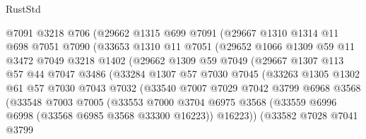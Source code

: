 \begin{lexlean}{RustStd}
\begin{coremodule}
                  @7091
                  @3218
                  @706
                  (@29662
                    @1315
                    @699
                    @7091
                    (@29667
                      @1310
                      @1314
                      @11
                      @698
                      @7051
                      @7090
                      (@33653
                        @1310
                        @11
                        @7051
                        (@29652
                          @1066
                          @1309
                          @59
                          @11
                          @3472
                          @7049
                          @3218
                          @1402
                          (@29662
                            @1309
                            @59
                            @7049
                            (@29667
                              @1307
                              @113
                              @57
                              @44
                              @7047
                              @3486
                              (@33284
                                @1307
                                @57
                                @7030
                                @7045
                                (@33263
                                  @1305
                                  @1302
                                  @61
                                  @57
                                  @7030
                                  @7043
                                  @7032
                                  (@33540
                                    @7007
                                    @7029
                                    @7042
                                    @3799
                                    @6968
                                    @3568
                                    (@33548
                                      @7003
                                      @7005
                                      (@33553
                                        @7000
                                        @3704
                                        @6975
                                        @3568
                                        (@33559 @6996 @6998 (@33568 @6985 @3568 @33300 @16223))
                                        @16223))
                                    (@33582
                                      @7028
                                      @7041
                                      @3799

\end{coremodule}
\end{lexlean}
